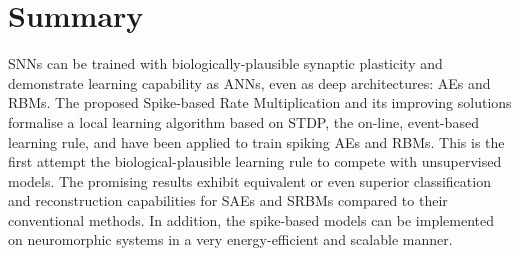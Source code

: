 \section{Summary}
SNNs can be trained with biologically-plausible synaptic plasticity and demonstrate \protect{} learning capability as \protect{} ANNs, even as deep architectures: AEs and RBMs.
The proposed Spike-based Rate Multiplication and its improving solutions formalise a local learning algorithm based on STDP, the on-line, event-based learning rule, and have been applied to train spiking AEs and RBMs.
This is the first attempt \protect{} \protect{} the biological-plausible learning rule to compete with \protect{} unsupervised \protect{} \protect{} models.
The promising results exhibit equivalent or even superior classification and reconstruction capabilities for SAEs and SRBMs compared to their conventional methods.
In addition, the spike-based models can be implemented on neuromorphic systems in a very energy-efficient and scalable manner.
